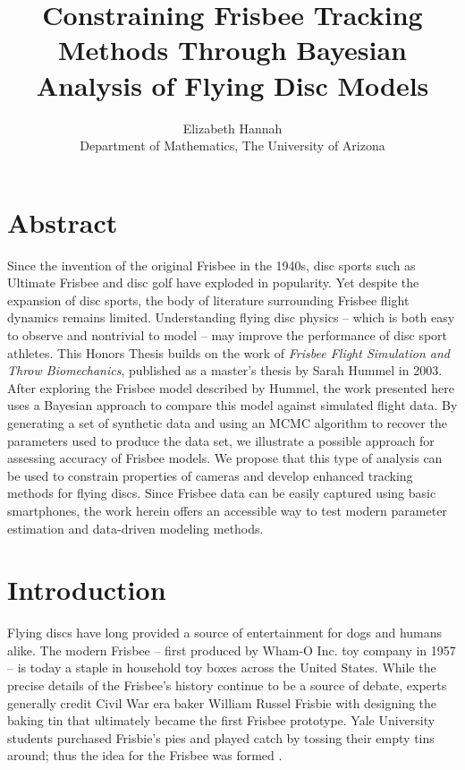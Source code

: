 \documentclass[a4paper,12pt, oneside]{article}
\title{Constraining Frisbee Tracking Methods Through Bayesian Analysis of Flying Disc Models}
\author{Elizabeth Hannah\\Department of Mathematics, The University of Arizona}
\date{}
\begin{document}
\maketitle

\section*{Abstract}
Since the invention of the original Frisbee in the 1940s, disc sports such as Ultimate Frisbee and disc golf have exploded in popularity. Yet despite the expansion of disc sports, the body of literature surrounding Frisbee flight dynamics remains limited. Understanding flying disc physics -- which is both easy to observe and nontrivial to model -- may improve the performance of disc sport athletes. This Honors Thesis builds on the work of \textit{Frisbee Flight Simulation and Throw Biomechanics}, published as a master's thesis by Sarah Hummel in 2003. After exploring the Frisbee model described by Hummel, the work presented here uses a Bayesian approach to compare this model against simulated flight data. By generating a set of synthetic data and using an MCMC algorithm to recover the parameters used to produce the data set, we illustrate a possible approach for assessing accuracy of Frisbee models. We propose that this type of analysis can be used to constrain properties of cameras and develop enhanced tracking methods for flying discs. Since Frisbee data can be easily captured using basic smartphones, the work herein offers an accessible way to test modern parameter estimation and data-driven modeling methods.
\section{Introduction}

Flying discs have long provided a source of entertainment for dogs and humans alike.  The modern Frisbee -- first produced by Wham-O Inc. toy company in 1957 -- is today a staple in household toy boxes across the United States.  While the precise details of the Frisbee's history continue to be a source of debate, experts generally credit Civil War era baker William Russel Frisbie with designing the baking tin that ultimately became the first Frisbee prototype.  Yale University students purchased Frisbie's pies and played catch by tossing their empty tins around; thus the idea for the Frisbee was formed \cite{frisorigins}.  
\end{document}

